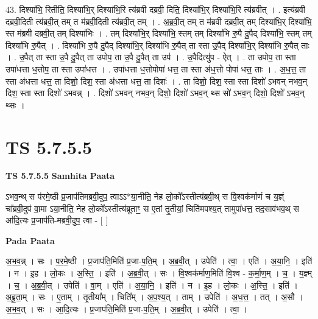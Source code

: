 \documentclass[17pt]{extarticle}
\begin{document}
43. दिश्या॑भि॒ रितीति॒ दिश्या॑भि॒र् दिश्या॑भि॒रि त्य॑ब्रवी दब्रवी॒ दिति॒ दिश्या॑भि॒र् दिश्या॑भि॒रि त्य॑ब्रवीत् । . इत्य॑ब्रवी दब्रवी॒दिती त्य॑ब्रवी॒त् तम् त म॑ब्रवी॒दिती त्य॑ब्रवी॒त् तम् । . अ॒ब्र॒वी॒त् तम् त म॑ब्रवी दब्रवी॒त् तम् दिश्या॑भि॒र् दिश्या॑भि॒ स्त म॑ब्रवी दब्रवी॒त् तम् दिश्या॑भिः । . तम् दिश्या॑भि॒र् दिश्या॑भि॒ स्तम् तम् दिश्या॑भि रु॒पै दु॒पैद् दिश्या॑भि॒ स्तम् तम् दिश्या॑भि रु॒पैत् । . दिश्या॑भि रु॒पै दु॒पैद् दिश्या॑भि॒र् दिश्या॑भि रु॒पैत् ता स्ता उ॒पैद् दिश्या॑भि॒र् दिश्या॑भि रु॒पैत् ताः । . उ॒पैत् ता स्ता उ॒पै दु॒पैत् ता उपोप॒ ता उ॒पै दु॒पैत् ता उप॑ । . उ॒पैदित्यु॑प - ऐत् । . ता उपोप॒ ता स्ता उपा॑धत्ता ध॒त्तोप॒ ता स्ता उपा॑धत्त । . उपा॑धत्ता ध॒त्तोपोपा॑ धत्त॒ ता स्ता अ॑ध॒त्तो पोपा॑ धत्त॒ ताः । . अ॒ध॒त्त॒ ता स्ता अ॑धत्ता धत्त॒ ता दिशो॒ दिश॒ स्ता अ॑धत्ता धत्त॒ ता दिशः॑ । . ता दिशो॒ दिश॒ स्ता स्ता दिशो॑ ऽभवन् नभव॒न् दिश॒ स्ता स्ता दिशो॑ ऽभवन्न् । . दिशो॑ ऽभवन् नभव॒न् दिशो॒ दिशो॑ ऽभव॒न् थ्स सो॑ ऽभव॒न् दिशो॒ दिशो॑ ऽभव॒न् थ्सः । \newline
\pagebreak
{}

\section{ TS 5.7.5.5 }

\textbf{TS 5.7.5.5 } \newline
\textbf{Samhita Paata} \newline

ऽभव॒न्थ् स प॑रमे॒ष्ठी प्र॒जाप॑तिमब्रवी॒दुप॒ त्वाऽऽ*या॒नीति॒ नेह लो॒को᳚ऽस्तीत्य॑ब्रवी॒थ् स वि॒श्वक॑र्माणं च य॒ज्ञ्ं चा᳚ब्रवी॒दुप॑ वा॒मा ऽया॒नीति॒ नेह लो॒को᳚ऽस्तीत्य॑ब्रूताꣳ॒॒ स ए॒तां तृ॒तीयां॒ चिति॑मपश्य॒त् तामुपा॑धत्त॒ तद॒साव॑भव॒थ् स आ॑दि॒त्यः प्र॒जाप॑ति-मब्रवी॒दुप॒ त्वा - [  ] \newline

\textbf{Pada Paata} \newline

अ॒भ॒व॒न्न् । सः । प॒र॒मे॒ष्ठी । प्र॒जाप॑ति॒मिति॑ प्र॒जा-प॒ति॒म् । अ॒ब्र॒वी॒त् । उपेति॑ । त्वा॒ । एति॑ । अ॒या॒नि॒ । इति॑ । न । इ॒ह । लो॒कः । अ॒स्ति॒ । इति॑ । अ॒ब्र॒वी॒त् । सः । वि॒श्वक॑र्माण॒मिति॑ वि॒श्व - क॒र्मा॒ण॒म् । च॒ । य॒ज्ञ्म् । च॒ । अ॒ब्र॒वी॒त् । उपेति॑ । वा॒म् । एति॑ । अ॒या॒नि॒ । इति॑ । न । इ॒ह । लो॒कः । अ॒स्ति॒ । इति॑ । अ॒ब्रू॒ता॒म् । सः । ए॒ताम् । तृ॒तीया᳚म् । चिति᳚म् । अ॒प॒श्य॒त् । ताम् । उपेति॑ । अ॒ध॒त्त॒ । तत् । अ॒सौ । अ॒भ॒व॒त् । सः । आ॒दि॒त्यः । प्र॒जाप॑ति॒मिति॑ प्र॒जा-प॒ति॒म् । अ॒ब्र॒वी॒त् । उपेति॑ । त्वा॒ ।  \newline
\end{document}
